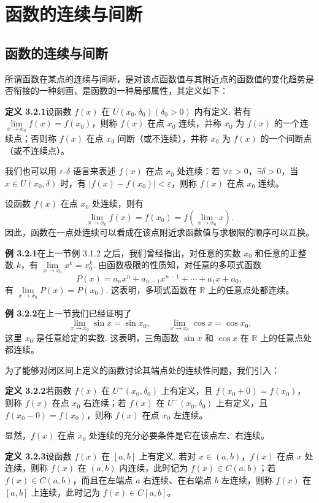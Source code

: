 \documentclass[UTF8, 12pt, fontset=fandol, oneside]{ctexart}
\begin{document}
\section{函数的连续与间断}

\subsection{函数的连续与间断}

所谓函数在某点的连续与间断，是对该点函数值与其附近点的函数值的变化趋势是否衔接的一种刻画，是函数的一种局部属性，其定义如下：

\noindent\textbf{定义 3.2.1}\quad 设函数 $f(x)$ 在 $U(x_0,\delta_0)(\delta_0>0)$ 内有定义. 若有 $\lim\limits_{x\to x_0}f(x)=f(x_0)$，则称 $f(x)$ 在点 $x_0$ 连续，并称 $x_0$ 为 $f(x)$ 的一个连续点；否则称 $f(x)$ 在点 $x_0$ 间断（或不连续），并称 $x_0$ 为 $f(x)$ 的一个间断点（或不连续点）。

我们也可以用 $\varepsilon$-$\delta$ 语言来表述 $f(x)$ 在点 $x_0$ 处连续：若 $\forall\varepsilon>0$，$\exists\delta>0$，当 $x\in U(x_0,\delta)$ 时，有 $|f(x)-f(x_0)|<\varepsilon$，则称 $f(x)$ 在点 $x_0$ 连续。

设函数 $f(x)$ 在点 $x_0$ 处连续，则有
\[
  \lim_{x\to x_0}f(x)=f(x_0)=f\left(\lim_{x\to x_0}x\right).
\]
因此，函数在一点处连续可以看成在该点附近求函数值与求极限的顺序可以互换。

\noindent\textbf{例 3.2.1}\quad 在上一节例 3.1.2 之后，我们曾经指出，对任意的实数 $x_0$ 和任意的正整数 $k$，有 $\lim\limits_{x\to x_0}x^k=x_0^k$. 由函数极限的性质知，对任意的多项式函数
\[
  P(x)=a_nx^n+a_{n-1}x^{n-1}+\cdots+a_1x+a_0,
\]
有 $\lim\limits_{x\to x_0}P(x)=P(x_0)$. 这表明，多项式函数在 $\mathbb{R}$ 上的任意点处都连续。

\noindent\textbf{例 3.2.2}\quad 在上一节我们已经证明了
\[
  \lim_{x\to x_0}\sin x=\sin x_0,\qquad \lim_{x\to x_0}\cos x=\cos x_0.
\]
这里 $x_0$ 是任意给定的实数. 这表明，三角函数 $\sin x$ 和 $\cos x$ 在 $\mathbb{R}$ 上的任意点处都连续。

为了能够对闭区间上定义的函数讨论其端点处的连续性问题，我们引入：

\noindent\textbf{定义 3.2.2}\quad 若函数 $f(x)$ 在 $U^+(x_0,\delta_0)$ 上有定义，且 $f(x_0+0)=f(x_0)$，则称 $f(x)$ 在点 $x_0$ 右连续；若 $f(x)$ 在 $U^-(x_0,\delta_0)$ 上有定义，且 $f(x_0-0)=f(x_0)$，则称 $f(x)$ 在点 $x_0$ 左连续。

显然，$f(x)$ 在点 $x_0$ 处连续的充分必要条件是它在该点左、右连续。

\noindent\textbf{定义 3.2.3}\quad 设函数 $f(x)$ 在 $[a,b]$ 上有定义. 若对 $x\in(a,b)$，$f(x)$ 在点 $x$ 处连续，则称 $f(x)$ 在 $(a,b)$ 内连续，此时记为 $f(x)\in C(a,b)$；若 $f(x)\in C(a,b)$，而且在左端点 $a$ 右连续、在右端点 $b$ 左连续，则称 $f(x)$ 在 $[a,b]$ 上连续，此时记为 $f(x)\in C[a,b]$。
\end{document}
